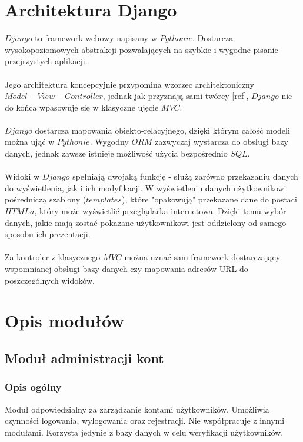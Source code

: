 \documentclass[pdflatex,11pt]{../aghdoc_version2}
\begin{document}
\chapter{Architektura Django}
$Django$ to framework webowy napisany w $Pythonie$. Dostarcza wysokopoziomowych
abstrakcji pozwalających na szybkie i wygodne pisanie przejrzystych aplikacji. \\ \\
Jego architektura koncepcyjnie przypomina wzorzec architektoniczny $Model-View-Controller$,
jednak jak przyznają sami twórcy [ref], $Django$ nie do końca wpasowuje się w klasyczne
ujęcie $MVC$. \\ \\
$Django$ dostarcza mapowania obiekto-relacyjnego, dzięki którym całość modeli można ująć
w $Pythonie$. Wygodny $ORM$ zazwyczaj wystarcza do obsługi bazy danych, jednak zawsze
istnieje możliwość użycia bezpośrednio $SQL$. \\ \\
Widoki w $Django$ spełniają dwojaką funkcję - służą zarówno przekazaniu danych do
wyświetlenia, jak i ich modyfikacji. W wyświetleniu danych użytkownikowi pośredniczą
szablony ($templates$), które "opakowują" przekazane dane do postaci $HTMLa$, który może
wyświetlić przeglądarka internetowa. Dzięki temu wybór danych, jakie mają zostać pokazane
użytkownikowi jest oddzielony od samego sposobu ich prezentacji. \\ \\
Za kontroler z klasycznego $MVC$ można uznać sam framework dostarczający wspomnianej
obsługi bazy danych czy mapowania adresów URL do poszczególnych widoków.

\chapter{Opis modułów}
\label{cha:opis_modulow}

\section{Moduł administracji kont}
\subsection{Opis ogólny}
Moduł odpowiedzialny za zarządzanie kontami użytkowników. Umożliwia czynności
logowania, wylogowania oraz rejestracji. Nie współpracuje z innymi modułami. Korzysta
jedynie z bazy danych w celu weryfikacji użytkowników.
\end{document}
